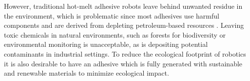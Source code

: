 


However, traditional hot-melt adhesive robots leave behind unwanted residue in the environment, which is problematic since most adhesives use harmful components and are derived from depleting petroleum-based resources \cite{Bassett2016}. Leaving toxic chemicals in natural environments, such as forests for biodiversity or environmental monitoring is unacceptable, as is depositing potential contaminants in industrial settings. To reduce the ecological footprint of robotics it is also desirable to have an adhesive which is fully generated with sustainable and renewable materials to minimize ecological impact.






